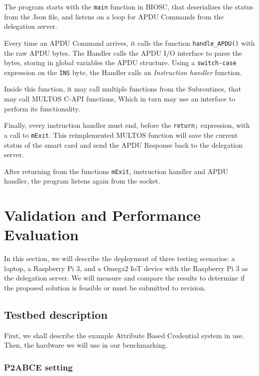 \documentclass[journal]{IEEEtran}
\begin{document}
The program starts with the \texttt{main} function in BIOSC, that deserializes the status from the Json file, and listens on a loop for APDU Commands from the delegation server.

Every time an APDU Command arrives, it calls the function \texttt{handle\_APDU()} with the raw APDU bytes. The Handler calls the APDU I/O interface to parse the bytes, storing in global variables the APDU structure. Using a \texttt{switch-case} expression on the \texttt{INS} byte, the Handler calls an \textit{Instruction handler} function.

Inside this function, it may call multiple functions from the Subroutines, that may call MULTOS C-API functions, Which in turn may use an interface to perform its functionality.

Finally, every instruction handler must end, before the \texttt{return;} expression, with a call to \texttt{mExit}. This reimplemented MULTOS function will save the current status of the smart card and send the APDU Response back to the delegation server.

After returning from the functions \texttt{mExit}, instruction handler and APDU handler, the program listens again from the socket.



\section{Validation and Performance Evaluation}\label{ch:validation}

In this section, we will describe the deployment of three testing scenarios: a laptop, a Raspberry Pi 3, and a Omega2 IoT device with the Raspberry Pi 3 as the delegation server. We will measure and compare the results to determine if the proposed solution is feasible or must be submitted to revision.

\subsection{Testbed description}

First, we shall describe the example Attribute Based Credential system in use. Then, the hardware we will use in our benchmarking.

\subsubsection{P2ABCE setting}
\end{document}
